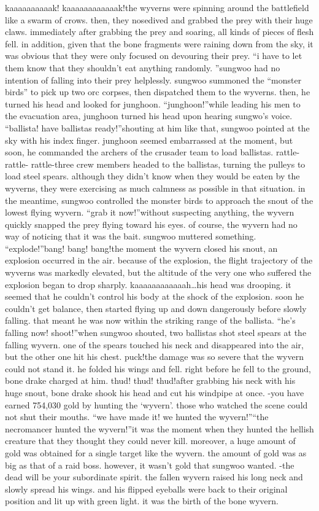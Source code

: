kaaaaaaaaaak! kaaaaaaaaaaaak!the wyverns were spinning around the battlefield like a swarm of crows.
 then, they nosedived and grabbed the prey with their huge claws.
immediately after grabbing the prey and soaring, all kinds of pieces of flesh fell.
 in addition, given that the bone fragments were raining down from the sky, it was obvious that they were only focused on devouring their prey.
“i have to let them know that they shouldn’t eat anything randomly.
”sungwoo had no intention of falling into their prey helplessly.
sungwoo summoned the “monster birds” to pick up two orc corpses, then dispatched them to the wyverns.
 then, he turned his head and looked for junghoon.
“junghoon!”while leading his men to the evacuation area, junghoon turned his head upon hearing sungwo’s voice.
“ballista! have ballistas ready!”shouting at him like that, sungwoo pointed at the sky with his index finger.
junghoon seemed embarrassed at the moment, but soon, he commanded the archers of the crusader team to load ballistas.
rattle- rattle- rattle-three crew members headed to the ballistas, turning the pulleys to load steel spears.
although they didn’t know when they would be eaten by the wyverns, they were exercising as much calmness as possible in that situation.
in the meantime, sungwoo controlled the monster birds to approach the snout of the lowest flying wyvern.
“grab it now!”without suspecting anything, the wyvern quickly snapped the prey flying toward his eyes.
of course, the wyvern had no way of noticing that it was the bait.
sungwoo muttered something.
“explode!”bang! bang! bang!the moment the wyvern closed his snout, an explosion occurred in the air.
 because of the explosion, the flight trajectory of the wyverns was markedly elevated, but the altitude of the very one who suffered the explosion began to drop sharply.
kaaaaaaaaaaaah…his head was drooping.
 it seemed that he couldn’t control his body at the shock of the explosion.
 soon he couldn’t get balance, then started flying up and down dangerously before slowly falling.
that meant he was now within the striking range of the ballista.
“he’s falling now! shoot!”when sungwoo shouted, two ballistas shot steel spears at the falling wyvern.
one of the spears touched his neck and disappeared into the air, but the other one hit his chest.
puck!the damage was so severe that the wyvern could not stand it.
 he folded his wings and fell.
 right before he fell to the ground, bone drake charged at him.
thud! thud! thud!after grabbing his neck with his huge snout, bone drake shook his head and cut his windpipe at once.
-you have earned 754,030 gold by hunting the ‘wyvern’.
those who watched the scene could not shut their mouths.
“we have made it! we hunted the wyvern!”“the necromancer hunted the wyvern!”it was the moment when they hunted the hellish creature that they thought they could never kill.
moreover, a huge amount of gold was obtained for a single target like the wyvern.
 the amount of gold was as big as that of a raid boss.
however, it wasn’t gold that sungwoo wanted.
-the dead will be your subordinate spirit.
the fallen wyvern raised his long neck and slowly spread his wings.
 and his flipped eyeballs were back to their original position and lit up with green light.
it was the birth of the bone wyvern.


